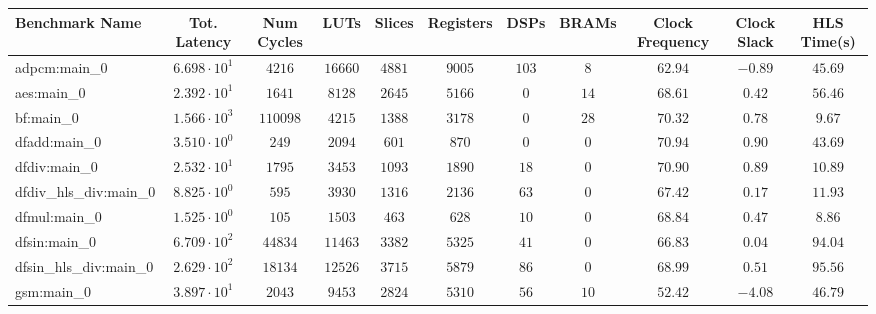 \begin{tabular}{|l|c|c|c|c|c|c|c|c|c|c|}
\hline
Benchmark Name          & Tot. Latency           & Num Cycles & LUTs       & Slices    & Registers & DSPs    & BRAMs   & Clock Frequency & Clock Slack & HLS Time(s) \\
\hline
adpcm:main\_0           & $ 6.698 \cdot 10^{1} $ & $ 4216   $ & $ 16660  $ & $ 4881  $ & $ 9005  $ & $ 103 $ & $ 8   $ & $ 62.94       $ & $ -0.89   $ & $ 45.69   $ \\
aes:main\_0             & $ 2.392 \cdot 10^{1} $ & $ 1641   $ & $ 8128   $ & $ 2645  $ & $ 5166  $ & $ 0   $ & $ 14  $ & $ 68.61       $ & $ 0.42    $ & $ 56.46   $ \\
bf:main\_0              & $ 1.566 \cdot 10^{3} $ & $ 110098 $ & $ 4215   $ & $ 1388  $ & $ 3178  $ & $ 0   $ & $ 28  $ & $ 70.32       $ & $ 0.78    $ & $ 9.67    $ \\
dfadd:main\_0           & $ 3.510 \cdot 10^{0} $ & $ 249    $ & $ 2094   $ & $ 601   $ & $ 870   $ & $ 0   $ & $ 0   $ & $ 70.94       $ & $ 0.90    $ & $ 43.69   $ \\
dfdiv:main\_0           & $ 2.532 \cdot 10^{1} $ & $ 1795   $ & $ 3453   $ & $ 1093  $ & $ 1890  $ & $ 18  $ & $ 0   $ & $ 70.90       $ & $ 0.89    $ & $ 10.89   $ \\
dfdiv\_hls\_div:main\_0 & $ 8.825 \cdot 10^{0} $ & $ 595    $ & $ 3930   $ & $ 1316  $ & $ 2136  $ & $ 63  $ & $ 0   $ & $ 67.42       $ & $ 0.17    $ & $ 11.93   $ \\
dfmul:main\_0           & $ 1.525 \cdot 10^{0} $ & $ 105    $ & $ 1503   $ & $ 463   $ & $ 628   $ & $ 10  $ & $ 0   $ & $ 68.84       $ & $ 0.47    $ & $ 8.86    $ \\
dfsin:main\_0           & $ 6.709 \cdot 10^{2} $ & $ 44834  $ & $ 11463  $ & $ 3382  $ & $ 5325  $ & $ 41  $ & $ 0   $ & $ 66.83       $ & $ 0.04    $ & $ 94.04   $ \\
dfsin\_hls\_div:main\_0 & $ 2.629 \cdot 10^{2} $ & $ 18134  $ & $ 12526  $ & $ 3715  $ & $ 5879  $ & $ 86  $ & $ 0   $ & $ 68.99       $ & $ 0.51    $ & $ 95.56   $ \\
gsm:main\_0             & $ 3.897 \cdot 10^{1} $ & $ 2043   $ & $ 9453   $ & $ 2824  $ & $ 5310  $ & $ 56  $ & $ 10  $ & $ 52.42       $ & $ -4.08   $ & $ 46.79   $ \\

\end{tabular}
